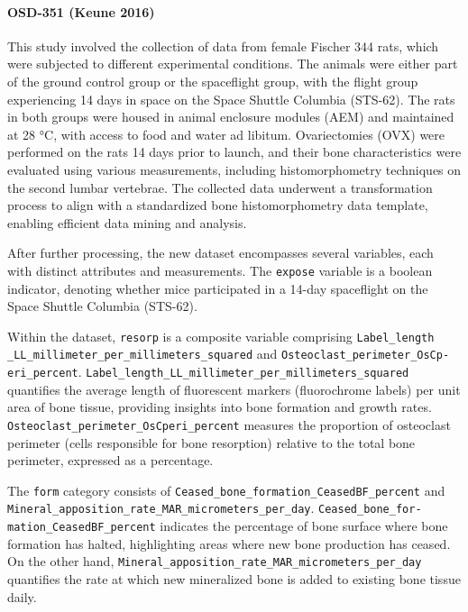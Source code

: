 \documentclass{article}
\begin{document}
\paragraph{OSD-351 (Keune 2016)}

This study involved the collection of data from female Fischer 344 rats, which were subjected to different experimental conditions. The animals were either part of the ground control group or the spaceflight group, with the flight group experiencing 14 days in space on the Space Shuttle Columbia (STS-62). The rats in both groups were housed in animal enclosure modules (AEM) and maintained at 28 °C, with access to food and water ad libitum. Ovariectomies (OVX) were performed on the rats 14 days prior to launch, and their bone characteristics were evaluated using various measurements, including histomorphometry techniques on the second lumbar vertebrae. The collected data underwent a transformation process to align with a standardized bone histomorphometry data template, enabling efficient data mining and analysis.

After further processing, the new dataset encompasses several variables, each with distinct attributes and measurements. The \texttt{expose} variable is a boolean indicator, denoting whether mice participated in a 14-day spaceflight on the Space Shuttle Columbia (STS-62).

Within the dataset, \texttt{resorp} is a composite variable comprising \texttt{Label}\texttt{\_length} \texttt{\_LL}\texttt{\_millimeter}\texttt{\_per}\texttt{\_millimeters}\texttt{\_squared} and \texttt{Osteoclast\_perimeter\_OsCp-} \texttt{eri\_percent}. \texttt{Label\_length\_LL\_millimeter\_per\_millimeters\_squared} quantifies the average length of fluorescent markers (fluorochrome labels) per unit area of bone tissue, providing insights into bone formation and growth rates. \texttt{Osteoclast\_perimeter\_OsCperi\_percent} measures the proportion of osteoclast perimeter (cells responsible for bone resorption) relative to the total bone perimeter, expressed as a percentage.

The \texttt{form} category consists of \texttt{Ceased\_bone\_formation\_CeasedBF\_percent} and \texttt{Mineral\_apposition\_rate\_MAR\_micrometers\_per\_day}. \texttt{Ceased\_bone\_for-} \texttt{mation\_CeasedBF\_percent} indicates the percentage of bone surface where bone formation has halted, highlighting areas where new bone production has ceased. On the other hand, \texttt{Mineral\_apposition\_rate\_MAR\_micrometers\_per\_day} quantifies the rate at which new mineralized bone is added to existing bone tissue daily.
\end{document}
